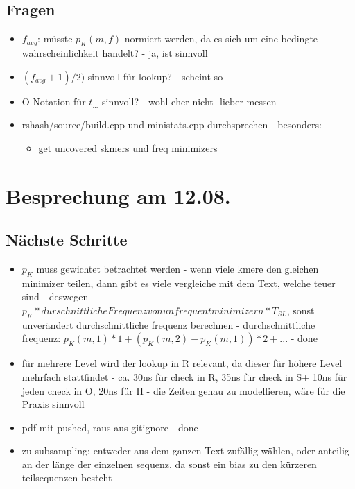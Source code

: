\documentclass{article}
\begin{document}
\subsection*{Fragen}
\begin{itemize}
	\item $f_{avg}$: müsste $p_K(m,f)$ normiert werden, da es sich um eine bedingte wahrscheinlichkeit handelt? - ja, ist sinnvoll
	\item $(f_{avg}+1)/2)$ sinnvoll für lookup? - scheint so
	\item O Notation für $t_{...}$ sinnvoll? - wohl eher nicht -lieber messen
	\item rshash/source/build.cpp und ministats.cpp durchsprechen - besonders:
	\begin{itemize}
		\item get uncovered skmers und freq minimizers
	\end{itemize}
\end{itemize}

\section*{Besprechung am 12.08.}
\subsection*{Nächste Schritte}
	\begin{itemize}
			\item $p_K$ muss gewichtet betrachtet werden - wenn viele kmere den gleichen minimizer teilen, dann gibt es viele vergleiche mit dem Text, welche teuer sind - deswegen $p_K * durschnittliche Frequenz von unfrequent minimizern * T_{SL}$, sonst unverändert durchschnittliche frequenz berechnen - durchschnittliche frequenz: $p_K(m,1) * 1 + (p_K(m,2)-p_K(m,1)) * 2 + ... $ - done
			\item für mehrere Level wird der lookup in R relevant, da dieser für höhere Level mehrfach stattfindet - ca. 30ns für check in R, 35ns für check in S+ 10ns für jeden check in O, 20ns für H - die Zeiten genau zu modellieren, wäre für die Praxis sinnvoll
			\item pdf mit pushed, raus aus gitignore - done
			\item zu subsampling: entweder aus dem ganzen Text zufällig wählen, oder anteilig an der länge der einzelnen sequenz, da sonst ein bias zu den kürzeren teilsequenzen besteht
		\end{itemize}
\end{document}
